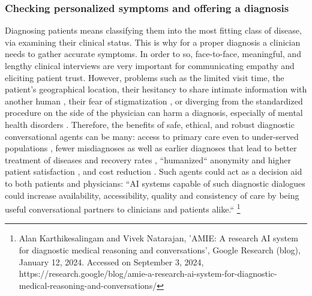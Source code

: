 \subsubsection{Checking personalized symptoms and offering a diagnosis}\label{Diagnosis}
Diagnosing patients means classifying them into the most fitting class of disease, via examining their clinical status. This is why for a proper diagnosis a clinician needs to gather accurate symptoms. In order to so, face-to-face, meaningful, and lengthy clinical interviews are very important for communicating empathy and eliciting patient trust. However, problems such as the limited visit time, the patient's geographical location, their hesitancy to share intimate information with another human \cite{mdddiagnosis2017, willingtodisclose2014, machinesinmentalhealth2017, mentalhealthbarriers2017}, their fear of stigmatization \cite{mentalhealthbarriers2017}, or diverging from the standardized procedure on the side of the physician can harm a diagnosis, especially of mental health disorders \cite{mdddiagnosis2017}. Therefore, the benefits of safe, ethical, and robust diagnostic conversational agents can be many: access to primary care even to under-served populations \cite{eds2014}, fewer misdiagnoses as well as earlier diagnoses that lead to better treatment of diseases and recovery rates \cite{mdddiagnosis2017}, ``humanized`` anonymity and higher patient satisfaction \cite{mdddiagnosis2017, mentalhealthbarriers2017, vickybot2023}, and cost reduction \cite{mdddiagnosis2017, AMIE2024}. Such agents could act as a decision aid to both patients and physicians: ``AI systems capable of such diagnostic dialogues could increase availability, accessibility, quality and consistency of care by being useful conversational partners to clinicians and patients alike.`` \footnote{Alan Karthikesalingam and Vivek Natarajan, 'AMIE: A research AI system for diagnostic medical reasoning and conversations', Google Research (blog), January 12, 2024. Accessed on September 3, 2024, https://research.google/blog/amie-a-research-ai-system-for-diagnostic-medical-reasoning-and-conversations/}

